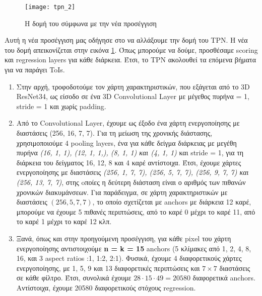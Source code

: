 \en
\begin{figure}[h]
  \centering
  \texttt{[image: tpn\_2]}
  \caption{\gr Η δομή του  σύμφωνα με την νέα προσέγγιση}
  \label{fig:gr_New_structure}
\end{figure}

\gr

Αυτή η νέα προσέγγιση μας οδήγησε στο να αλλάξουμε την δομή του \en TPN\gr. Η νέα του δομή  απεικονίζεται στην εικόνα  \ref{fig:gr_New_structure}. Όπως
μπορούμε να δούμε, προσθέσαμε \en scoring \gr και \en regression layers \gr για κάθε διάρκεια. Έτσι, το \en TPN \gr ακολουθεί τα επόμενα βήματα για να παράγει \en ToIs\gr.
\begin{enumerate}
\item Στην αρχή, τροφοδοτούμε τον χάρτη χαρακτηριστικών, που εξάγεται από το \en 3D ResNet34\gr, ως είσοδο σε ένα \en 3D Convolutional Layer \gr με μέγεθος πυρήνα = 1,
  \en stride = 1 \gr και χωρίς \en padding\gr.
\item Από το \en Convolutional Layer\gr, έχουμε ως έξοδο ένα χάρτη ενεργοποίησης με διαστάσεις (256, 16, 7, 7). Για τη μείωση της χρονικής διάστασης, χρησιμοποιούμε 4 \en pooling layers\gr,
  ένα για κάθε δείγμα διάρκειας με μεγέθη πυρήνα  \textit{(16, 1, 1), (12, 1, 1,), (8, 1, 1) και (4, 1, 1)} και \en stride = 1\gr, για τη διάρκεια του δείγματος 16, 12, 8 και 4 καρέ αντίστοιχα.
  Έτσι, έχουμε χάρτες ενεργοποίησης με διαστάσεις \textit{(256, 1, 7, 7), (256, 5, 7, 7), (256, 9, 7, 7) και (256, 13, 7, 7)}, στης oποίες η δεύτερη διάσταση είναι ο αριθμός των πιθανών
  χρονικών διακυμάνσεων. Για παράδειγμα, σε  χάρτη χαρακτηριστικών με διαστάσεις $(256, 5, 7, 7)$, το οποίο σχετίζεται με \en anchors \gr με διάρκεια 12 καρέ, μπορούμε να έχουμε 5 πιθανές περιπτώσεις,
  από το καρέ 0 μέχρι το καρέ 11, από το καρέ 1 μέχρι το καρέ 12 κλπ.
  
\item Ξανά, όπως και στην προηγούμενη προσέγγιση, για κάθε \en pixel \gr του χάρτη ενεργοποίησης αντιστοιχούμε \en\textbf{n = k = 15}
  anchors \gr(5 κλίμακες από 1, 2, 4, 8, 16, και 3 \en aspect ratios :1, 1:2, 2:1). Φυσικά, έχουμε 4 διαφορετικούς χάρτες ενεργοποίησης, με 1, 5, 9 και 13
  διαφορετικές περιπτώσεις και  $7  \times 7$ διαστάσεις σε κάθε φίλτρο. Έτσι, συνολικά έχουμε $28  \cdot 15 \cdot 49 = 20580$ διαφορετικά \en anchors\gr.
  Αντίστοιχα, έχουμε 20580 διαφορετικούς στόχους \en regression\gr.

\end{enumerate}

